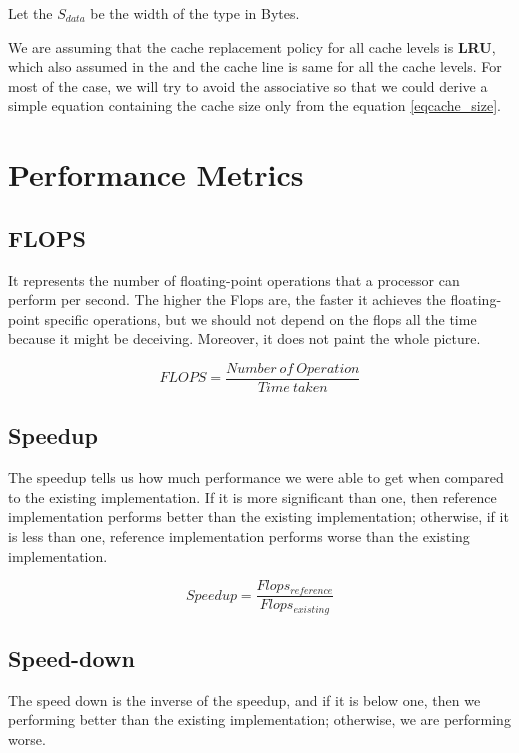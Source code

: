 Let the $S_{data}$ be the width of the type in Bytes.

We are assuming that the cache replacement policy for all cache levels is 
\textbf{LRU}, which also assumed in the \citep{BLIS} and the cache 
line is same for all the cache levels. For most of the case, 
we will try to avoid the associative so that we could derive 
a simple equation containing the cache size only from the equation \ref{eqcache_size}.

\section{Performance Metrics}

\subsection{FLOPS}

It represents the number of floating-point operations that a processor can perform per second. 
The higher the Flops are, the faster it achieves the floating-point specific operations, 
but we should not depend on the flops all the time because it might be deceiving. 
Moreover, it does not paint the whole picture.

\begin{equation}
    FLOPS = \frac{Number\ of\ Operation}{Time\ taken}
    \label{eqflops}
\end{equation}

\subsection{Speedup}

The speedup tells us how much performance we were able to get when compared to 
the existing implementation. If it is more significant than one, 
then reference implementation performs better than the existing implementation; 
otherwise, if it is less than one, reference implementation performs worse 
than the existing implementation.

\begin{equation}
    Speedup = \frac{Flops_{reference}}{Flops_{existing}}
    \label{eqspeedup}
\end{equation}

\subsection{Speed-down}

The speed down is the inverse of the speedup, and if it is below one, 
then we performing better than the existing implementation; 
otherwise, we are performing worse.

